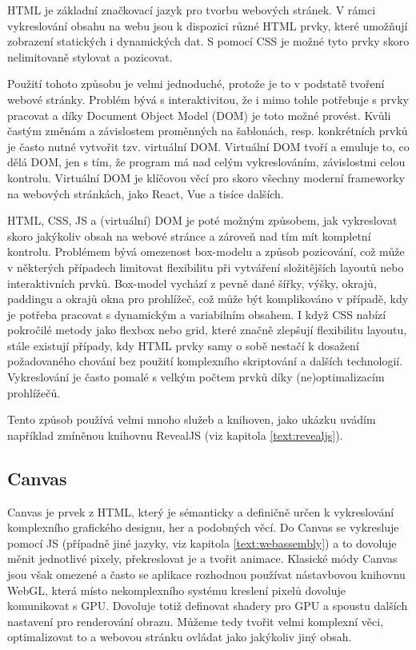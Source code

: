 HTML je základní značkovací jazyk pro tvorbu webových stránek. 
V rámci vykreslování obsahu na webu jsou k dispozici různé HTML prvky, které umožňují zobrazení statických i dynamických dat.
S pomocí CSS je možné tyto prvky skoro nelimitovaně stylovat a pozicovat.

Použití tohoto způsobu je velmi jednoduché, protože je to v podstatě tvoření webové stránky.
Problém bývá s interaktivitou, že i mimo tohle potřebuje s prvky pracovat a díky Document Object Model (DOM) je toto možné provést.
Kvůli častým změnám a závislostem proměnných na šablonách, resp. konkrétních prvků je často nutné vytvořit tzv. virtuální DOM.
Virtuální DOM tvoří a emuluje to, co dělá DOM, jen s tím, že program má nad celým vykreslováním, závislostmi celou kontrolu.
Virtuální DOM je klíčovou věcí pro skoro všechny moderní frameworky na webových stránkách, jako React, Vue a tisíce dalších.

HTML, CSS, JS a (virtuální) DOM je poté možným způsobem, jak vykreslovat skoro jakýkoliv obsah na webové stránce a zároveň nad tím mít kompletní kontrolu.
Problémem bývá omezenost box-modelu a způsob pozicování, což může v některých případech limitovat flexibilitu při vytváření složitějších layoutů nebo interaktivních prvků. Box-model vychází z pevně dané šířky, výšky, okrajů, paddingu a okrajů okna pro prohlížeč, což může být komplikováno v případě, kdy je potřeba pracovat s dynamickým a variabilním obsahem. 
I když CSS nabízí pokročilé metody jako flexbox nebo grid, které značně zlepšují flexibilitu layoutu, stále existují případy, kdy HTML prvky samy o sobě nestačí k dosažení požadovaného chování bez použití komplexního skriptování a dalších technologií.
Vykreslování je často pomalé s velkým počtem prvků díky (ne)optimalizacím prohlížečů.

Tento způsob používá velmi mnoho služeb a knihoven, jako ukázku uvádím například zmíněnou knihovnu RevealJS (viz kapitola \ref{text:revealjs}).

\subsection{Canvas}

Canvas je prvek z HTML, který je sémanticky a definičně určen k vykreslování komplexního grafického designu, her a podobných věcí.
Do Canvas se vykresluje pomocí JS (případně jiné jazyky, viz kapitola \ref{text:webassembly}) a to dovoluje měnit jednotlivé pixely, překreslovat je a tvořit animace.
Klasické módy Canvas jsou však omezené a často se aplikace rozhodnou používat nástavbovou knihovnu WebGL, která místo nekomplexního systému kreslení pixelů dovoluje komunikovat s GPU.
Dovoluje totiž definovat shadery pro GPU a spoustu dalších nastavení pro renderování obrazu.
Můžeme tedy tvořit velmi komplexní věci, optimalizovat to a webovou stránku ovládat jako jakýkoliv jiný obsah. 

